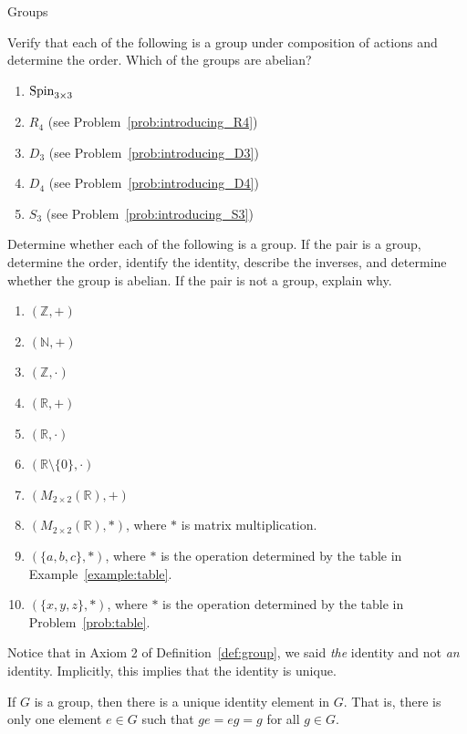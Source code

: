 \begin{section}{Groups}
\begin{problem}
Verify that each of the following is a group under composition of actions and determine the order. Which of the groups are abelian?
\begin{enumerate}[label=\rm{(\alph*)}]
\item $\operatorname{Spin}_{3\times 3}$
\item $R_4$ (see Problem~\ref{prob:introducing_R4})
\item $D_3$ (see Problem~\ref{prob:introducing_D3})
\item $D_4$ (see Problem~\ref{prob:introducing_D4})
\item $S_3$ (see Problem~\ref{prob:introducing_S3})
\end{enumerate}
\end{problem}

\begin{problem}
Determine whether each of the following is a group.  If the pair is a group, determine the order, identify the identity, describe the inverses, and determine whether the group is abelian. If the pair is not a group, explain why.
\begin{enumerate}[label=\rm{(\alph*)}]
\item $(\mathbb{Z},+)$
\item $(\mathbb{N},+)$
\item $(\mathbb{Z},\cdot)$
\item $(\mathbb{R},+)$
\item $(\mathbb{R},\cdot)$
\item $(\mathbb{R}\setminus \{0\},\cdot)$
\item $(M_{2\times 2}(\mathbb{R}),+)$
\item $(M_{2\times 2}(\mathbb{R}),*)$, where $*$ is matrix multiplication.
\item $(\{a,b,c\},*)$, where $*$ is the operation determined by the table in Example~\ref{example:table}.
\item $(\{x,y,z\},*)$, where $*$ is the operation determined by the table in Problem~\ref{prob:table}.
\end{enumerate}
\end{problem}

Notice that in Axiom 2 of Definition~\ref{def:group}, we said \emph{the} identity and not \emph{an} identity.  Implicitly, this implies that the identity is unique.

\begin{theorem}\label{thm:unique_id}
If $G$ is a group, then there is a unique identity element in $G$.  That is, there is only one element $e\in G$ such that $ge=eg=g$ for all $g\in G$.
\end{theorem}


\end{section}

